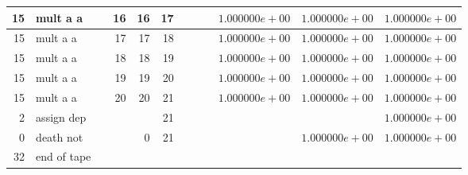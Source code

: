 \documentclass{article}
\begin{document}
\begin{tabular}{|r|l|r|r|r|r||r|r||r|r|r|r|}
15 & mult a a & & 16 & 16 & 17 & & & &$ 1.000000e+00 $&$ 1.000000e+00 $&$ 1.000000e+00 $\\ \hline 
15 & mult a a & & 17 & 17 & 18 & & & &$ 1.000000e+00 $&$ 1.000000e+00 $&$ 1.000000e+00 $\\ \hline 
15 & mult a a & & 18 & 18 & 19 & & & &$ 1.000000e+00 $&$ 1.000000e+00 $&$ 1.000000e+00 $\\ \hline 
15 & mult a a & & 19 & 19 & 20 & & & &$ 1.000000e+00 $&$ 1.000000e+00 $&$ 1.000000e+00 $\\ \hline 
15 & mult a a & & 20 & 20 & 21 & & & &$ 1.000000e+00 $&$ 1.000000e+00 $&$ 1.000000e+00 $\\ \hline 
2 & assign dep & & & & 21 & & & & & &$ 1.000000e+00 $\\ \hline 
0 & death not & & & 0 & 21 & & & & &$ 1.000000e+00 $&$ 1.000000e+00 $\\ \hline 
 32 & end of tape & & & & & & & & & &  \\ \hline 
\end{tabular}
\end{document}
